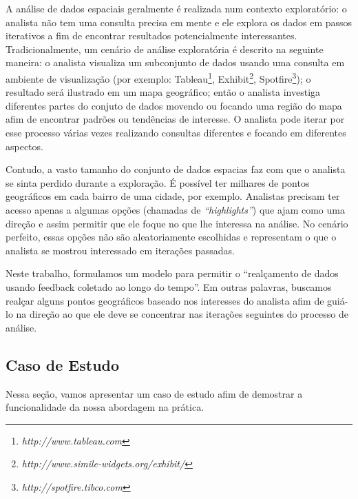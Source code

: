 A análise de dados espaciais geralmente é realizada num contexto exploratório: o analista não tem uma consulta precisa em mente e ele explora os dados em passos iterativos a fim de encontrar resultados potencialmente interessantes. Tradicionalmente, um cenário de análise exploratória é descrito na seguinte maneira: o analista visualiza um subconjunto de dados usando uma consulta em ambiente de visualização (por exemplo: Tableau\footnote{\it http://www.tableau.com},
Exhibit\footnote{\it http://www.simile-widgets.org/exhibit/},
Spotfire\footnote{\it http://spotfire.tibco.com}); o resultado será ilustrado em um mapa geográfico; então o analista investiga diferentes partes do conjuto de dados movendo ou focando uma região do mapa afim de encontrar padrões ou tendências de interesse. O analista pode iterar por esse processo várias vezes realizando consultas diferentes e focando em diferentes aspectos.

Contudo, a vasto tamanho do conjunto de dados espacias faz com que o analista se sinta perdido durante a exploração. É possível ter milhares de pontos geográficos em cada bairro de uma cidade, por exemplo. Analistas precisam ter acesso apenas a algumas opções (chamadas de {\em ``highlights''}) que ajam como uma direção e assim permitir que ele foque no que lhe interessa na análise. No cenário perfeito, essas opções não são aleatoriamente escolhidas e representam o que o analista se mostrou interessado em iterações passadas.

Neste trabalho, formulamos um modelo para permitir o ``realçamento de dados usando feedback coletado ao longo do tempo''. Em outras palavras, buscamos realçar alguns pontos geográficos baseado nos interesses do analista afim de guiá-lo na direção ao que ele deve se concentrar nas iterações seguintes do processo de análise.

\subsection{Caso de Estudo}

Nessa seção, vamos apresentar um caso de estudo afim de demostrar a funcionalidade da nossa abordagem na prática.

